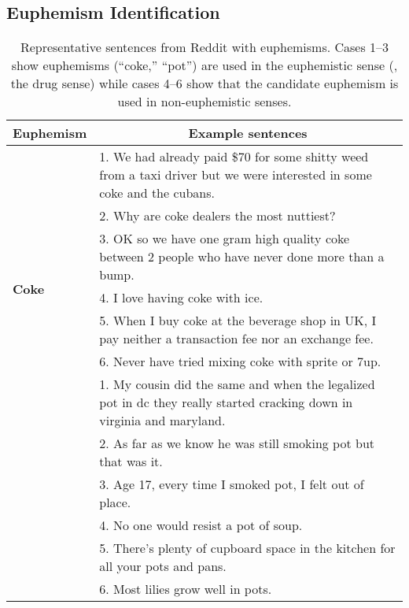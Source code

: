 \subsection{Euphemism Identification}
\label{sec:intro_iden}
\begin{table*}[t!]
	\centering
	\small
	\caption{Representative sentences from Reddit with euphemisms. Cases 1--3 show euphemisms (``coke,'' ``pot'') are used in the euphemistic sense (\ie, the drug sense) while cases 4--6 show that the candidate euphemism is used in non-euphemistic senses.}
	\begin{tabular}{p{}p{}}
		\toprule
		\multicolumn{1}{c}{\textbf{Euphemism}} &  \multicolumn{1}{c}{\textbf{Example sentences}} \\
		\midrule
		\multirow{7}{*}{\centering \textbf{\space \space \space \space Coke}}
		& 1. We had already paid \$70 for some shitty weed from a taxi driver but we were interested in some coke and the cubans. \\
		& 2. Why are coke dealers the most nuttiest? \\
		& 3. OK so we have one gram high quality coke between 2 people who have never done more than a bump. \\
		& 4. I love having coke with ice. \\
		& 5. When I buy coke at the beverage shop in UK, I pay neither a transaction fee nor an exchange fee. \\
		& 6. Never have tried mixing coke with sprite or 7up. \\ 
		\midrule
		\multirow{7}{*}{\centering \textbf{\space \space \space \space Pot}}
		& 1. My cousin did the same and when the legalized pot in dc they really started cracking down in virginia and maryland. \\
		& 2. As far as we know he was still smoking pot but that was it. \\
		& 3. Age 17, every time I smoked pot, I felt out of place. \\
		& 4. No one would resist a pot of soup. \\
		& 5. There's plenty of cupboard space in the kitchen for all your pots and pans. \\
		& 6. Most lilies grow well in pots. \\
		\bottomrule
	\end{tabular}
	\label{table:example4}
\end{table*}

